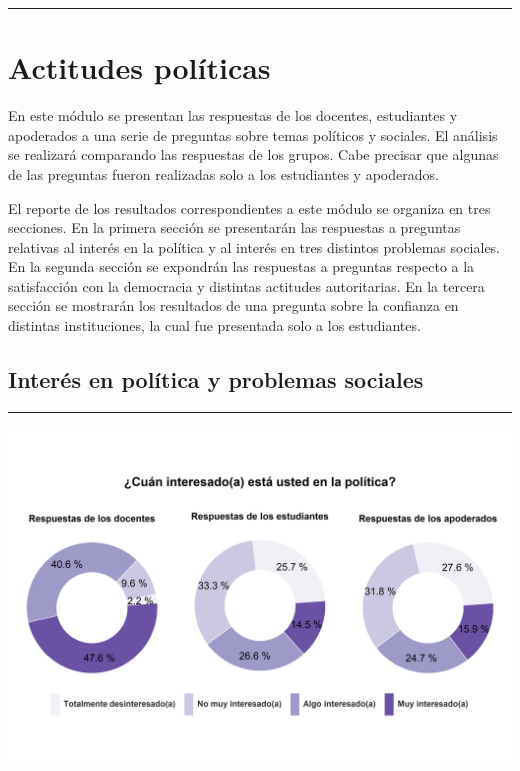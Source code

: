 \documentclass[
  14pt,
]{book}
\let\origfigure\figure
\let\endorigfigure\endfigure
\renewenvironment{figure}[1][2] {
  \expandafter\origfigure\expandafter[H]
} {
  \endorigfigure
}
\begin{document}
\begin{center}\rule{0.5\linewidth}{0.5pt}\end{center}

\hypertarget{actitudes-poluxedticas}{%
\chapter{Actitudes políticas}\label{actitudes-poluxedticas}}

En este módulo se presentan las respuestas de los docentes, estudiantes y apoderados a una serie de preguntas sobre temas políticos y sociales. El análisis se realizará comparando las respuestas de los grupos. Cabe precisar que algunas de las preguntas fueron realizadas solo a los estudiantes y apoderados.

El reporte de los resultados correspondientes a este módulo se organiza en tres secciones. En la primera sección se presentarán las respuestas a preguntas relativas al interés en la política y al interés en tres distintos problemas sociales. En la segunda sección se expondrán las respuestas a preguntas respecto a la satisfacción con la democracia y distintas actitudes autoritarias. En la tercera sección se mostrarán los resultados de una pregunta sobre la confianza en distintas instituciones, la cual fue presentada solo a los estudiantes.

\hypertarget{interuxe9s-en-poluxedtica-y-problemas-sociales}{%
\section{Interés en política y problemas sociales}\label{interuxe9s-en-poluxedtica-y-problemas-sociales}}

\begin{center}\rule{0.5\linewidth}{0.5pt}\end{center}

\begin{figure}[!ht]

{\centering \includegraphics[width=0.8\linewidth,]{images/graph_intpol} 

}

\caption{Interés en la política}\label{fig:unnamed-chunk-37}
\end{figure}
\end{document}
